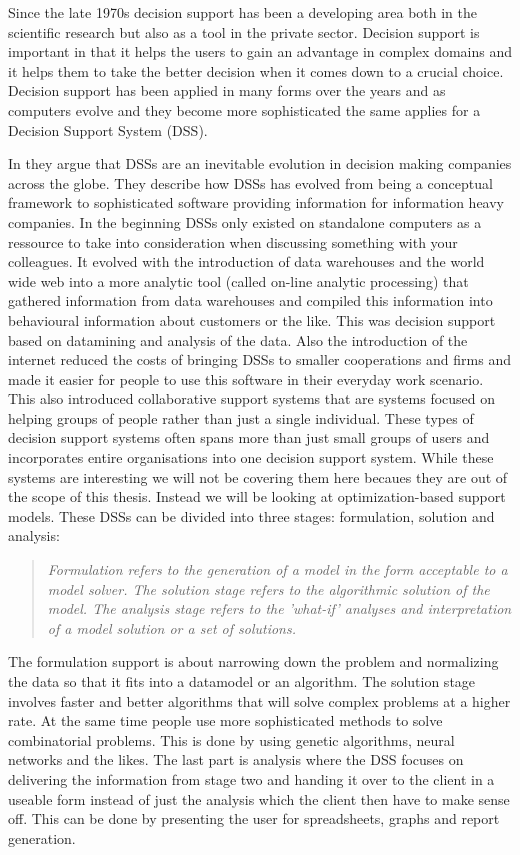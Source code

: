Since the late 1970s decision support has been a developing area both in the scientific research but also as a tool in the private sector. Decision support is important in that it helps the users to gain an advantage in complex domains and it helps them to take the better decision when it comes down to a crucial choice. Decision support has been applied in many forms over the years and as computers evolve and they become more sophisticated the same applies for a Decision Support System (DSS).

In \cite{shim2002past} they argue that DSSs are an inevitable evolution in decision making companies across the globe. They describe how DSSs has evolved from being a conceptual framework to sophisticated software providing information for information heavy companies. In the beginning DSSs only existed on standalone computers as a ressource to take into consideration when discussing something with your colleagues. It evolved with the introduction of data warehouses and the world wide web into a more analytic tool (called on-line analytic processing) that gathered information from data warehouses and compiled this information into behavioural information about customers or the like. This was decision support based on datamining and analysis of the data. Also the introduction of the internet reduced the costs of bringing DSSs to smaller cooperations and firms and made it easier for people to use this software in their everyday work scenario. This also introduced collaborative support systems that are systems focused on helping groups of people rather than just a single individual. These types of decision support systems often spans more than just small groups of users and incorporates entire organisations into one decision support system. While these systems are interesting we will not be covering them here becaues they are out of the scope of this thesis. Instead we will be looking at optimization-based support models. These DSSs can be divided into three stages: formulation, solution and analysis\cite{shim2002past}:
\begin{quotation}
\textit{Formulation refers to the generation of a model in the form acceptable to a model solver. The solution stage refers to the algorithmic solution of the model. The analysis stage refers to the 'what-if' analyses and interpretation of a model solution or a set of solutions.}
\end{quotation}
The formulation support is about narrowing down the problem and normalizing the data so that it fits into a datamodel or an algorithm. The solution stage involves faster and better algorithms that will solve complex problems at a higher rate. At the same time people use more sophisticated methods to solve combinatorial problems. This is done by using genetic algorithms, neural networks and the likes\cite{shim2002past}. The last part is analysis where the DSS focuses on delivering the information from stage two and handing it over to the client in a useable form instead of just the analysis which the client then have to make sense off. This can be done by presenting the user for spreadsheets, graphs and report generation.

